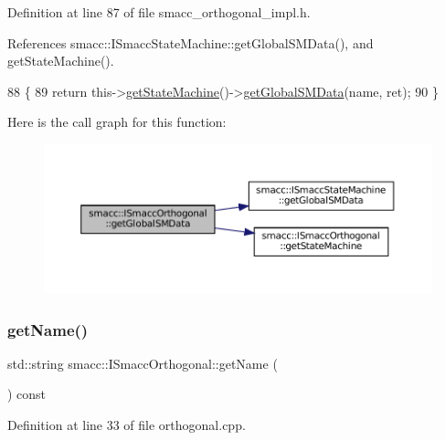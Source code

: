 Definition at line 87 of file smacc\+\_\+orthogonal\+\_\+impl.\+h.



References smacc\+::\+I\+Smacc\+State\+Machine\+::get\+Global\+S\+M\+Data(), and get\+State\+Machine().


\begin{DoxyCode}
88 \{
89     \textcolor{keywordflow}{return} this->\hyperlink{classsmacc_1_1ISmaccOrthogonal_aae265ec480b8ed552ddc79afd2d93a62}{getStateMachine}()->\hyperlink{classsmacc_1_1ISmaccStateMachine_aeda2d6813c6c428bf318a5792e014b61}{getGlobalSMData}(name, ret);
90 \}
\end{DoxyCode}
Here is the call graph for this function\+:
\nopagebreak
\begin{figure}[H]
\begin{center}
\leavevmode
\includegraphics[width=350pt]{classsmacc_1_1ISmaccOrthogonal_aa763280bc6980811744c8e8f11b2dcd0_cgraph}
\end{center}
\end{figure}
\mbox{\label{classsmacc_1_1ISmaccOrthogonal_a45a444be97410cb061f8b9d5d77ee9b7}} 
\subsubsection{\texorpdfstring{get\+Name()}{getName()}}
{\footnotesize\ttfamily std\+::string smacc\+::\+I\+Smacc\+Orthogonal\+::get\+Name (\begin{DoxyParamCaption}{ }\end{DoxyParamCaption}) const\hspace{0.3cm}{\ttfamily [virtual]}}



Definition at line 33 of file orthogonal.\+cpp.



